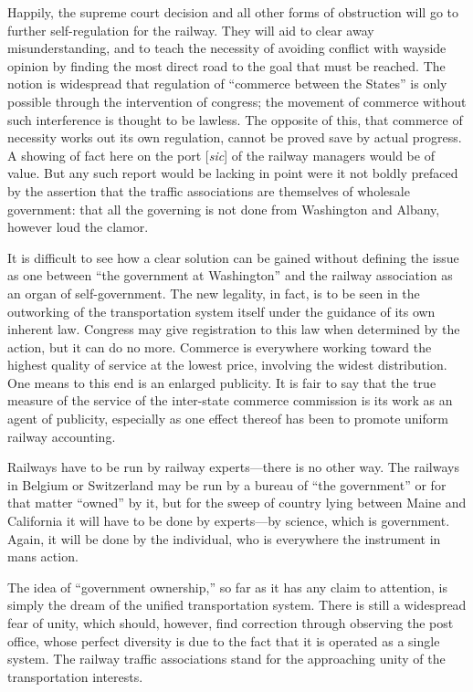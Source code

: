 \documentclass[openany,nobib]{tufte-book}
\begin{document}
Happily, the supreme court decision and all other forms of obstruction
will go to further self-regulation for the railway. They will aid to
clear away misunderstanding, and to teach the necessity of avoiding
conflict with wayside opinion by finding the most direct road to the
goal that must be reached. The notion is widespread that regulation of
``commerce between the States'' is only possible through the
intervention of congress; the movement of commerce without such
interference is thought to be lawless. The opposite of this, that
commerce of necessity works out its own regulation, cannot be proved
save by actual progress. A showing of fact here on the port
{[}\emph{sic}{]} of the railway managers would be of value. But any such
report would be lacking in point were it not boldly prefaced by the
assertion that the traffic associations are themselves of wholesale
government: that all the governing is not done from Washington and
Albany, however loud the clamor.

It is difficult to see how a clear solution can be gained without
defining the issue as one between ``the government at Washington'' and
the railway association as an organ of self-government. The new
legality, in fact, is to be seen in the outworking of the transportation
system itself under the guidance of its own inherent law. Congress may
give registration to this law when determined by the action, but it can
do no more. Commerce is everywhere working toward the highest quality of
service at the lowest price, involving the widest distribution. One
means to this end is an enlarged publicity. It is fair to say that the
true measure of the service of the inter-state commerce commission is
its work as an agent of publicity, especially as one effect thereof has
been to promote uniform railway accounting.

Railways have to be run by railway experts---there is no other way. The
railways in Belgium or Switzerland may be run by a bureau of ``the
government'' or for that matter ``owned'' by it, but for the sweep of
country lying between Maine and California it will have to be done by
experts---by science, which is government. Again, it will be done by the
individual, who is everywhere the instrument in man\textquotesingle s
action.

The idea of ``government ownership,'' so far as it has any claim to
attention, is simply the dream of the unified transportation system.
There is still a widespread fear of unity, which should, however, find
correction through observing the post office, whose perfect diversity is
due to the fact that it is operated as a single system. The railway
traffic associations stand for the approaching unity of the
transportation interests.
\end{document}
